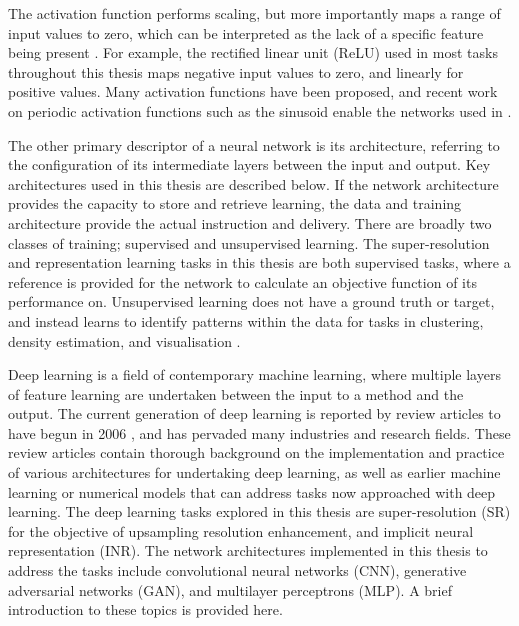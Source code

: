 The activation function performs scaling, but more importantly maps a range of input values to zero, which can be interpreted as the lack of a specific feature being present \parencite{williamsLogicActivationFunctions1986}.
For example, the rectified linear unit (ReLU) used in most tasks throughout this thesis maps negative input values to zero, and linearly for positive values.
Many activation functions have been proposed, and recent work on periodic activation functions such as the sinusoid \parencite{sitzmann2019siren} enable the networks used in .

The other primary descriptor of a neural network is its architecture, referring to the configuration of its intermediate layers between the input and output.
Key architectures used in this thesis are described below.
If the network architecture provides the capacity to store and retrieve learning, the data and training architecture provide the actual instruction and delivery.
There are broadly two classes of training; supervised and unsupervised learning.
The super-resolution and representation learning tasks in this thesis are both supervised tasks, where a reference is provided for the network to calculate an objective function of its performance on.
Unsupervised learning does not have a ground truth or target, and instead learns to identify patterns within the data for tasks in clustering, density estimation, and visualisation \parencite{bishopPatternRecognitionMachine2006}.

Deep learning is a field of contemporary machine learning, where multiple layers of feature learning are undertaken between the input to a method and the output.
The current generation of deep learning is reported by review articles to have begun in 2006 \parencite{dengDeepLearningMethods2014,goodfellowDeepLearning2016a}, and has pervaded many industries and research fields.
These review articles contain thorough background on the implementation and practice of various architectures for undertaking deep learning, as well as earlier machine learning or numerical models that can address tasks now approached with deep learning.
The deep learning tasks explored in this thesis are super-resolution (SR) for the objective of upsampling resolution enhancement, and implicit neural representation (INR).
The network architectures implemented in this thesis to address the tasks include convolutional neural networks (CNN), generative adversarial networks (GAN), and multilayer perceptrons (MLP).
A brief introduction to these topics is provided here.

